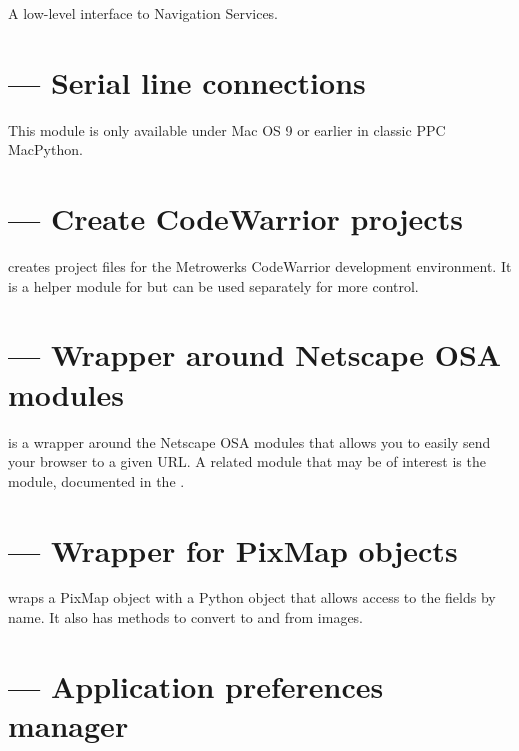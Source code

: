 A low-level interface to Navigation Services. 


\section{ --- Serial line connections}

This module is only available under Mac OS 9 or earlier in classic PPC
MacPython.

\section{ --- Create CodeWarrior projects}

 creates project files for the Metrowerks CodeWarrior
development environment. It is a helper module for
 but can be used separately for more
control.


\section{ --- Wrapper around Netscape OSA modules}

 is a wrapper around the Netscape OSA modules that
allows you to easily send your browser to a given URL.  A related
module that may be of interest is the  module,
documented in the .


\section{ --- Wrapper for PixMap objects}

 wraps a PixMap object with a Python object that
allows access to the fields by name. It also has methods to convert
to and from  images.


\section{ --- Application preferences manager}


